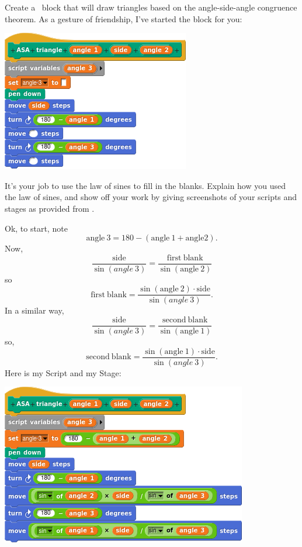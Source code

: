 \documentclass[noauthor,nooutcomes,handout,hints]{../ximera}
\begin{document}
\begin{question}
Create a \snap\ block that will draw triangles based on the angle-side-angle
congruence theorem.  As a gesture of friendship, I've started the
block for you:
\begin{center}
  \includegraphics{asaBlockBLANK}
\end{center}
It's your job to use the law of  sines to fill in the blanks. Explain
how you used the law of sines, and show off your work by giving
screenshots of your scripts and stages as provided from \snap.
\begin{freeResponse}
  Ok, to start, note
  \[
  \mathrm{angle~3} = 180 - (\mathrm{angle~1}+\mathrm{angle 2}).
  \]
  Now, 
  \[
  \frac{\mathrm{side}}{\sin(angle~3)} = \frac{\mathrm{first~blank}}{\sin(\mathrm{angle~2})}
  \]
  so
  \[
  \mathrm{first~blank} = \frac{\sin(\mathrm{angle~2})\cdot \mathrm{side}}{\sin(angle~3)}.
  \]
  In a similar way, 
    \[
    \frac{\mathrm{side}}{\sin(angle~3)} = \frac{\mathrm{second~blank}}{\sin(\mathrm{angle~1})}
    \]
    so,
    \[
    \mathrm{second~blank} = \frac{\sin(\mathrm{angle~1})\cdot \mathrm{side}}{\sin(angle~3)}.
    \]
    Here is my Script and my Stage:
    \begin{center}
      \includegraphics[width=.4\textwidth]{asaBlockCOMPLETE}   \qquad {}
    \end{center}
\end{freeResponse}
\end{question}
\mynewpage
\end{document}
